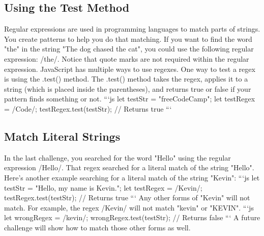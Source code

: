 \documentclass{article}%
\begin{document}
\subsection{Using the Test Method}%
\label{subsec:UsingtheTestMethod}%
Regular expressions are used in programming languages to match parts of strings. You create patterns to help you do that matching.\newline%
If you want to find the word "the" in the string "The dog chased the cat", you could use the following regular expression: /the/. Notice that quote marks are not required within the regular expression.\newline%
JavaScript has multiple ways to use regexes. One way to test a regex is using the .test() method. The .test() method takes the regex, applies it to a string (which is placed inside the parentheses), and returns true or false if your pattern finds something or not.\newline%
```js\newline%
let testStr = "freeCodeCamp";\newline%
let testRegex = /Code/;\newline%
testRegex.test(testStr);\newline%
// Returns true\newline%
```\newline%

%
\subsection{Match Literal Strings}%
\label{subsec:MatchLiteralStrings}%
In the last challenge, you searched for the word "Hello" using the regular expression /Hello/. That regex searched for a literal match of the string "Hello". Here's another example searching for a literal match of the string "Kevin":\newline%
```js\newline%
let testStr = "Hello, my name is Kevin.";\newline%
let testRegex = /Kevin/;\newline%
testRegex.test(testStr);\newline%
// Returns true\newline%
```\newline%
Any other forms of "Kevin" will not match. For example, the regex /Kevin/ will not match "kevin" or "KEVIN".\newline%
```js\newline%
let wrongRegex = /kevin/;\newline%
wrongRegex.test(testStr);\newline%
// Returns false\newline%
```\newline%
A future challenge will show how to match those other forms as well.\newline%
\end{document}

